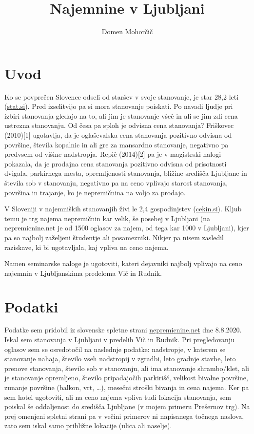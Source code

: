 \documentclass[a4paper, 12pt]{article}
\begin{document}
\title{Najemnine v Ljubljani}
\author{Domen Mohorčič}
\maketitle

\section{Uvod}

Ko se povprečen Slovenec odseli od staršev v svoje stanovanje, je star 28,2
leti (\href{https://www.stat.si/statweb/News/Index/7570}{stat.si}). Pred
izselitvijo pa si mora stanovanje poiskati. Po navadi ljudje pri izbiri
stanovanja gledajo na to, ali jim je stanovanje všeč in ali se jim zdi cena
ustrezna stanovanju. Od česa pa sploh je odvisna cena stanovanja? Friškovec
(2010)[1] ugotavlja, da je oglaševalska cena stanovanja
pozitivno odvisna od površine, števila kopalnic in ali gre za mansardno
stanovanje, negativno pa predvsem od višine nadstropja. Repič (2014)[2] pa je
v magistrski nalogi pokazala, da je prodajna cena stanovanja pozitivno odvisna
od prisotnosti dvigala, parkirnega mesta, opremljenosti stanovanja, bližine
središča Ljubljane in števila sob v stanovanju, negativno pa na ceno vplivajo
starost stanovanja, površina in trajanje, ko je nepremičnina na voljo za
prodajo.

V Sloveniji v najemniških stanovanjih živi le 2,4
gospodinjstev (\href{https://cekin.si/nepremicnine/trnova-pot-do-lastnega-doma-zakaj-mora-biti-tako.html}{cekin.si}).
Kljub temu je trg najema nepremičnin kar velik, še posebej v Ljubljani (na
nepremicnine.net je od 1500 oglasov za najem, od tega kar 1000 v Ljubljani),
kjer pa so najbolj zaželjeni študentje ali posamezniki. Nikjer pa nisem
zasledil raziskave, ki bi ugotavljala, kaj vpliva na ceno najema.

Namen seminarske naloge je ugotoviti, kateri dejavniki najbolj vplivajo na ceno
najemnin v Ljubljanskima predeloma Vič in Rudnik.

\section{Podatki}

Podatke sem pridobil iz slovenske spletne strani
\href{https://www.nepremicnine.net}{nepremicnine.net} dne 8.8.2020.
Iskal sem stanovanja v Ljubljani v predelih Vič in Rudnik.
Pri pregledovanju oglasov sem se osredotočil na naslednje podatke:
nadstropje, v katerem se stanovanje nahaja, število vseh nadstropij v zgradbi,
leto gradnje stavbe, leto prenove stanovanja, število sob v stanovanju,
ali ima stanovanje shrambo/klet, ali je stanovanje opremljeno, število
pripadajočih parkirišč, velikost bivalne površine, zunanje površine
(balkon, vrt, \dots), mesečni stroški bivanja in cena najema. Ker pa sem hotel
ugotoviti, ali na ceno najema vpliva tudi lokacija stanovanja, sem poiskal še
oddaljenost do središča Ljubljane (v mojem primeru Prešernov trg). Na prej
omenjeni spletni strani pa v večini primerov ni napisanega točnega naslova,
zato sem iskal samo približne lokacije (ulica ali naselje).
\end{document}
